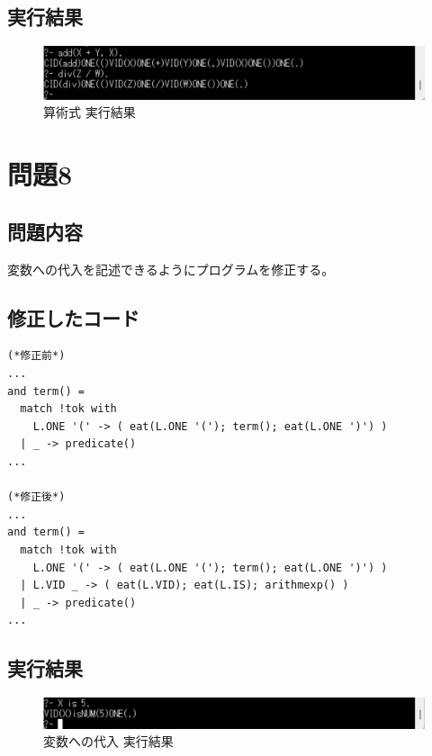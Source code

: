 \documentclass{ltjsarticle}
\begin{document}
\subsection{実行結果}
\begin{figure}[htbp]
  \centering
  \caption{算術式 実行結果}
  \label{fig:calc}
  \includegraphics[scale = 0.6]{calc.png}
\end{figure}


\section{問題8}
\subsection{問題内容}
変数への代入を記述できるようにプログラムを修正する。

\subsection{修正したコード}
\begin{lstlisting}[caption = 代入 修正点]
(*修正前*)
...
and term() =
  match !tok with
    L.ONE '(' -> ( eat(L.ONE '('); term(); eat(L.ONE ')') )
  | _ -> predicate()
...

(*修正後*)
...
and term() =
  match !tok with
    L.ONE '(' -> ( eat(L.ONE '('); term(); eat(L.ONE ')') )
  | L.VID _ -> ( eat(L.VID); eat(L.IS); arithmexp() )
  | _ -> predicate()
...

\end{lstlisting}

\subsection{実行結果}

\begin{figure}[htbp]
  \centering
  \caption{変数への代入 実行結果}
  \label{fig:dainyuu}
  \includegraphics[scale = 0.6]{dainyuu.png}
\end{figure}
\end{document}
